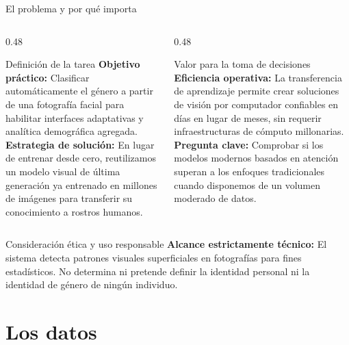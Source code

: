 \documentclass[aspectratio=43,10pt]{beamer}
\begin{document}
\begin{frame}{El problema y por qué importa}
  \begin{columns}[T]
    \begin{column}{0.48\textwidth}
      \begin{block}{Definición de la tarea}
        \small
        \textbf{Objetivo práctico:} Clasificar automáticamente el género a partir de una fotografía facial para habilitar interfaces adaptativas y analítica demográfica agregada.\\[6pt]
        \textbf{Estrategia de solución:} En lugar de entrenar desde cero, reutilizamos un modelo visual de última generación ya entrenado en millones de imágenes para transferir su conocimiento a rostros humanos.
      \end{block}
    \end{column}
    \hfill
    \begin{column}{0.48\textwidth}
      \begin{block}{Valor para la toma de decisiones}
        \small
        \textbf{Eficiencia operativa:} La transferencia de aprendizaje permite crear soluciones de visión por computador confiables en días en lugar de meses, sin requerir infraestructuras de cómputo millonarias.\\[6pt]
        \textbf{Pregunta clave:} Comprobar si los modelos modernos basados en atención superan a los enfoques tradicionales cuando disponemos de un volumen moderado de datos.
      \end{block}
    \end{column}
  \end{columns}

  \vspace{0.12cm}
  \begin{block}{Consideración ética y uso responsable}
    \footnotesize
    \textbf{Alcance estrictamente técnico:} El sistema detecta patrones visuales superficiales en fotografías para fines estadísticos. No determina ni pretende definir la identidad personal ni la identidad de género de ningún individuo.
  \end{block}
\end{frame}

\section{Los datos}
\end{document}

